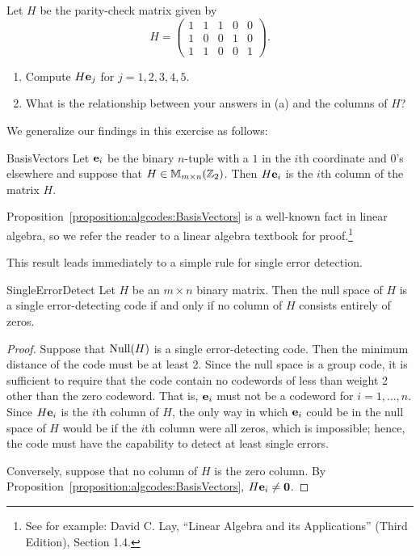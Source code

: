 \begin{exercise}{}
Let $H$ be the parity-check matrix given by
\[ H =
\left(
\begin{array}{ccccc}
1 & 1 & 1 & 0 & 0 \\
1 & 0 & 0 & 1 & 0 \\
1 & 1 & 0 & 0 & 1
\end{array}
\right).\]
\begin{enumerate}
\item 
Compute $H {\bold e}_j$ for $j = 1,2,3,4,5$.
\item
What is the relationship between your answers in (a) and the columns of $H$?
\end{enumerate}
\end{exercise}

We generalize our findings in this exercise as follows:

\begin{prop}{BasisVectors}
Let ${\bold e}_i$ be the binary $n$-tuple with a $1$ in the $i$th
coordinate and $0$'s elsewhere and suppose that $H \in {\Bbb M}_{m
\times n}({\Bbb Z}_2)$. Then $H{\bold e}_i$ is the $i$th column of
the matrix $H$.  
\end{prop}
 Proposition~\ref{proposition:algcodes:BasisVectors} is a well-known fact in linear algebra, so we refer the reader to a linear algebra textbook for proof.\footnote{See for example: David C. Lay, ``Linear Algebra and its Applications'' (Third Edition), Section 1.4.}
 
 This result leads immediately to a simple rule for single error detection.
 
\begin{prop}{SingleErrorDetect}
Let $H$ be an $m \times n$ binary matrix. Then the null space of $H$
is a single error-detecting code if and only if no column of $H$
consists entirely of zeros. 
\end{prop}
 
 \begin{proof}
Suppose that ${\rm Null}(H)$ is a single error-detecting code. Then the minimum
distance of the code must be at least 2. Since the null space is a
group code, it is sufficient to require that the code contain no
codewords of less than weight 2 other than the zero codeword. That
is, ${\bold e}_i$ must not be a codeword for $i = 1, \ldots, n$. Since
$H{\bold e}_i$ is the $i$th column of $H$, the only way in which
${\bold e}_i$ could be in the null space of $H$ would be if the $i$th
column were all zeros, which is impossible; hence, the code must have
the capability to detect at least single errors.
 
 Conversely, suppose that no column of $H$ is the zero column. By 
Proposition~\ref{proposition:algcodes:BasisVectors}, $H{\bold e}_i \neq {\bold 0}$.
\end{proof}
 
